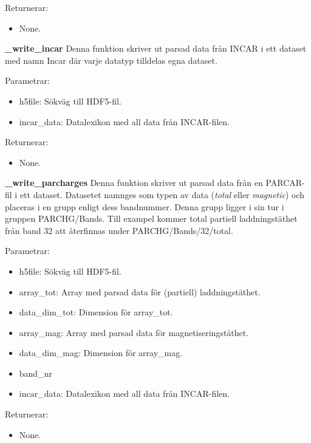 \documentclass[a4paper,12pt]{article}
\begin{document}
Returnerar:
\begin{itemize}
\setlength\itemsep{0em}
\item None.
\end{itemize}

\textbf{\_write\_incar} \newline
Denna funktion skriver ut parsad data från INCAR i ett dataset med namn Incar där varje datatyp
tilldelas egna dataset.

Parametrar:
\begin{itemize}
\setlength\itemsep{0em}
\item h5file: Sökväg till HDF5-fil.
\item incar\_data: Datalexikon med all data från INCAR-filen.
\end{itemize}

Returnerar:
\begin{itemize}
\setlength\itemsep{0em}
\item None.
\end{itemize}

\textbf{\_write\_parcharges} \newline
Denna funktion skriver ut parsad data från en PARCAR-fil i ett dataset. Datasetet namnges som typen av data (\emph{total} eller \emph{magnetic}) och placeras i en grupp enligt dess bandnummer. Denna grupp ligger i sin tur i gruppen PARCHG/Bands. Till exampel kommer total partiell laddningstäthet från band 32 att återfinnas under PARCHG/Bands/32/total.

Parametrar:
\begin{itemize}
\setlength\itemsep{0em}
\item h5file: Sökväg till HDF5-fil.
\item array\_tot: Array med parsad data för (partiell) laddningstäthet.
\item data\_dim\_tot: Dimension för array\_tot.
\item array\_mag: Array med parsad data för magnetiseringstäthet.
\item data\_dim\_mag: Dimension för array\_mag.
\item band\_nr
\item incar\_data: Datalexikon med all data från INCAR-filen.
\end{itemize}

Returnerar:
\begin{itemize}
\setlength\itemsep{0em}
\item None.
\end{itemize}
\end{document}
